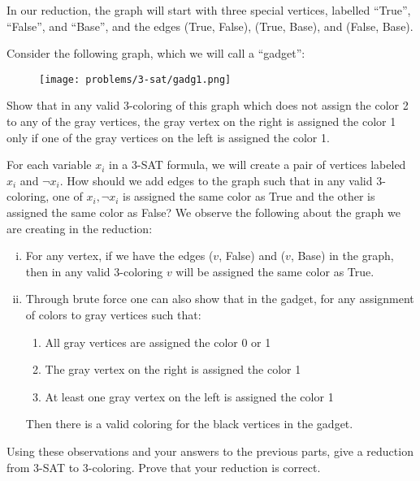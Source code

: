 In our reduction, the graph will start with three special vertices, labelled ``True'', ``False'', and ``Base'', and the edges (True, False), (True, Base), and (False, Base).
\begin{subparts}

\subpart Consider the following graph, which we will call a ``gadget'':

\begin{figure}[h] \centering
\texttt{[image: problems/3-sat/gadg1.png]}
\end{figure}

Show that in any valid 3-coloring of this graph which does not assign the color 2 to any of the gray vertices, the gray vertex on the right is assigned the color 1 only if one of the gray vertices on the left is assigned the color 1.

\subpart For each variable $x_i$ in a 3-SAT formula, we will create a
pair of vertices labeled $x_i$ and $\lnot x_i$. How should we add
edges to the graph such that in any valid 3-coloring, one of
$x_i, \lnot x_i$ is assigned the same color as True and the other is assigned the same color as False?
\subpart We observe the following about the graph we are creating in the reduction:
\begin{enumerate}[(i)]
\item For any vertex, if we have the edges ($v$, False) and ($v$, Base) in the graph, then in any valid 3-coloring $v$ will be assigned the same color as True.

\item Through brute force one can also show that in the gadget, for any assignment of colors to gray vertices such that:
\begin{enumerate}[(1)]
\item All gray vertices are assigned the color 0 or 1
\item The gray vertex on the right is assigned the color 1
\item At least one gray vertex on the left is assigned the color 1
\end{enumerate}
Then there is a valid coloring for the black vertices in the gadget.
\end{enumerate}

Using these observations and your answers to the previous parts, give
a reduction from 3-SAT to 3-coloring. Prove that your reduction is correct.

\end{subparts}
